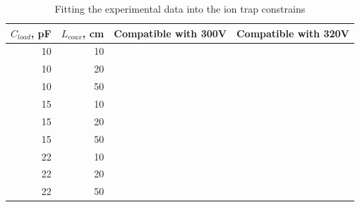 \begin{table}[h]
\centering
\begin{tabular}{| r | r | c | c |}
	\hline
	$C_{load}$, pF & $L_{coax}$, cm & Compatible with 300V & Compatible with 320V\\
	\hline \hline
	10 & 10 & \xmark & \xmark\\
	\hline
	10 & 20 & \cmark & \cmark\\
	\hline
	10 & 50 & \xmark & \xmark\\
	\hline
	15 & 10 & \xmark & \cmark\\
	\hline
	15 & 20 & \cmark & \xmark\\
	\hline
	15 & 50 & \xmark & \xmark\\
	\hline
	22 & 10 & \cmark & \cmark\\
	\hline
	22 & 20 & \xmark & \xmark\\
	\hline
	22 & 50 & \xmark & \xmark\\
	\hline
\end{tabular}
\label{tbl:ideal_drive}
\caption{Fitting the experimental data into the ion trap constrains}
\end{table}